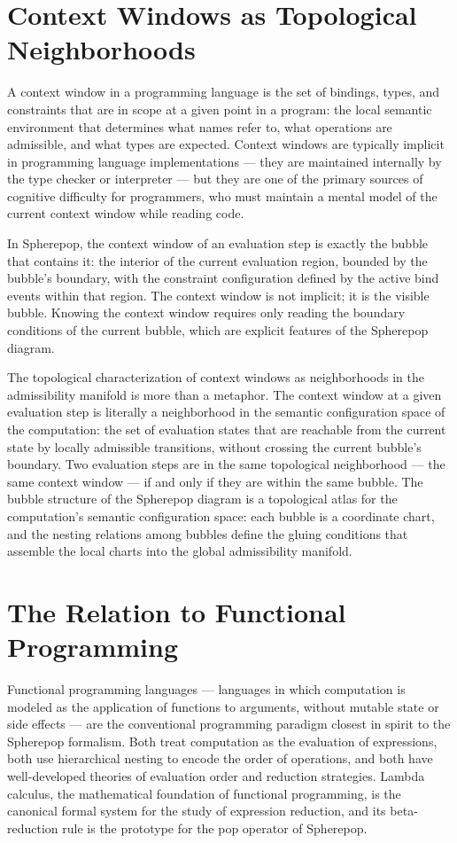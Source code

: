 \documentclass[12pt,openany]{book}
\theoremstyle{plain}
\theoremstyle{definition}
\theoremstyle{remark}
\begin{document}
\section{Context Windows as Topological Neighborhoods}

A context window in a programming language is the set of bindings, types, and constraints that are in scope at a given point in a program: the local semantic environment that determines what names refer to, what operations are admissible, and what types are expected. Context windows are typically implicit in programming language implementations — they are maintained internally by the type checker or interpreter — but they are one of the primary sources of cognitive difficulty for programmers, who must maintain a mental model of the current context window while reading code.

In Spherepop, the context window of an evaluation step is exactly the bubble that contains it: the interior of the current evaluation region, bounded by the bubble's boundary, with the constraint configuration defined by the active bind events within that region. The context window is not implicit; it is the visible bubble. Knowing the context window requires only reading the boundary conditions of the current bubble, which are explicit features of the Spherepop diagram.

The topological characterization of context windows as neighborhoods in the admissibility manifold is more than a metaphor. The context window at a given evaluation step is literally a neighborhood in the semantic configuration space of the computation: the set of evaluation states that are reachable from the current state by locally admissible transitions, without crossing the current bubble's boundary. Two evaluation steps are in the same topological neighborhood — the same context window — if and only if they are within the same bubble. The bubble structure of the Spherepop diagram is a topological atlas for the computation's semantic configuration space: each bubble is a coordinate chart, and the nesting relations among bubbles define the gluing conditions that assemble the local charts into the global admissibility manifold.

\section{The Relation to Functional Programming}

Functional programming languages — languages in which computation is modeled as the application of functions to arguments, without mutable state or side effects — are the conventional programming paradigm closest in spirit to the Spherepop formalism. Both treat computation as the evaluation of expressions, both use hierarchical nesting to encode the order of operations, and both have well-developed theories of evaluation order and reduction strategies. Lambda calculus, the mathematical foundation of functional programming, is the canonical formal system for the study of expression reduction, and its beta-reduction rule is the prototype for the pop operator of Spherepop.
\end{document}

